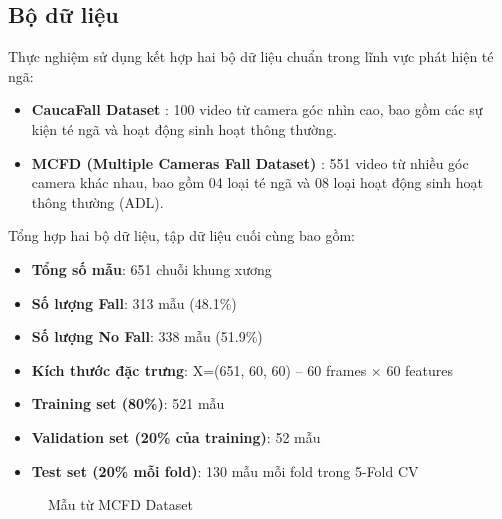 \subsection{Bộ dữ liệu}
\label{sec:dataset}

Thực nghiệm sử dụng kết hợp hai bộ dữ liệu chuẩn trong lĩnh vực phát hiện té ngã:

\begin{itemize}
    \item \textbf{CaucaFall Dataset} \cite{caucafall}: 100 video từ camera góc nhìn cao, bao gồm các sự kiện té ngã và hoạt động sinh hoạt thông thường.
    \item \textbf{MCFD (Multiple Cameras Fall Dataset)} \cite{mcfd}: 551 video từ nhiều góc camera khác nhau, bao gồm 04 loại té ngã và 08 loại hoạt động sinh hoạt thông thường (ADL).
\end{itemize}

Tổng hợp hai bộ dữ liệu, tập dữ liệu cuối cùng bao gồm:

\begin{itemize}
    \item \textbf{Tổng số mẫu}: 651 chuỗi khung xương
    \item \textbf{Số lượng Fall}: 313 mẫu (48.1\%)
    \item \textbf{Số lượng No Fall}: 338 mẫu (51.9\%)
    \item \textbf{Kích thước đặc trưng}: X=(651, 60, 60) -- 60 frames × 60 features
\end{itemize}

\begin{itemize}
    \item \textbf{Training set (80\%)}: 521 mẫu
    \item \textbf{Validation set (20\% của training)}: 52 mẫu
    \item \textbf{Test set (20\% mỗi fold)}: 130 mẫu mỗi fold trong 5-Fold CV
\end{itemize}

\begin{figure}[h]
    \centering
    \begin{minipage}{0.45\textwidth}
        \centering
        \caption[Mẫu từ CaucaFall Dataset]{Mẫu từ CaucaFall Dataset}
        \label{fig:caucafall_sample}
    \end{minipage}
    \hfill
    \begin{minipage}{0.45\textwidth}
        \centering
        \caption[Mẫu từ MCFD Dataset]{Mẫu từ MCFD Dataset}
        \label{fig:mcfd_sample}
    \end{minipage}
\end{figure}

